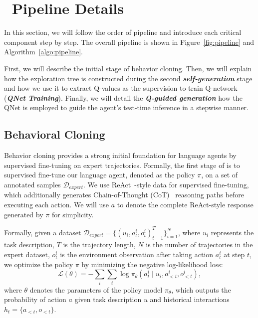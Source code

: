 
\section{\ours~Pipeline Details}

In this section, we will follow the order of {\ours} pipeline and introduce each critical component step by step. The overall pipeline is shown in Figure~\ref{fig:pipeline} and Algorithm~\ref{algo:pipeline}.

First, we will describe the initial stage of behavior cloning. Then, we will explain how the exploration tree is constructed during the second \textbf{\textit{self-generation}} stage and how we use it to extract Q-values as the supervision to train Q-network (\textbf{\textit{QNet Training}}). Finally, we will detail the \textit{\textbf{Q-guided generation}} how the QNet is employed to guide the agent's test-time inference in a stepwise manner.

\subsection{Behavioral Cloning}
 Behavior cloning provides a strong initial foundation for language agents by supervised fine-tuning on expert trajectories. Formally, the first stage of {\ours} is to supervised fine-tune our language agent, denoted as the policy $\pi$, on a set of annotated samples $\mathcal{D}_{expert}$. We use ReAct~\citep{yao2023react}-style data for supervised fine-tuning, which additionally generates Chain-of-Thought (CoT)~\citep{cot} reasoning paths before executing each action. We will use $a$ to denote the complete ReAct-style response generated by $\pi$ for simplicity.

Formally, given a dataset $\mathcal{D}_{expert} = \{(u_i, a^i_t,o^i_t)_{t=1}^T\}_{i=1}^{N}$, where $u_i$ represents the task description, $T$ is the trajectory length, $N$ is the number of trajectories in the expert dataset, $o^i_t$ is the environment observation after taking action $a^i_t$ at step $t$, we optimize the policy $\pi$ by minimizing the negative log-likelihood loss:
\begin{equation}
\label{equation:BCloss}
\mathcal{L}(\theta) = - \sum_i \sum_t \log \pi_\theta(a^i_t \mid u_i,a^i_{<t},o^i_{<t}),
\end{equation}
where $\theta$ denotes the parameters of the policy model $\pi_\theta$, which outputs the probability of action $a$ given task description $u$ and historical interactions $h_t=\{a_{<t},o_{<t}\}$.


